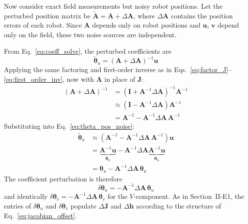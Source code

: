 \documentclass[lettersize,journal]{IEEEtran}
\begin{document}
Now consider exact field measurements but noisy robot positions. Let the perturbed position matrix be $\tilde{\mathbf{A}} = \mathbf{A} + \Delta\mathbf{A}$, where $\Delta\mathbf{A}$ contains the position errors of each robot. Since $\mathbf{A}$ depends only on robot positions and $\mathbf{u}$, $\mathbf{v}$ depend only on the field, these two noise sources are independent.

From Eq.~\eqref{eq:coeff_solve}, the perturbed coefficients are
\begin{equation}
    \tilde{\boldsymbol{\theta}}_u = (\mathbf{A} + \Delta\mathbf{A})^{-1}\mathbf{u}
    \label{eq:theta_pos_noise}
\end{equation}
Applying the same factoring and first-order inverse as in Eqs.~\eqref{eq:factor_J}--\eqref{eq:first_order_inv}, now with $\mathbf{A}$ in place of $\mathbf{J}$:
\begin{align}
    (\mathbf{A} + \Delta\mathbf{A})^{-1} &= \left(\mathbf{I} + \mathbf{A}^{-1}\Delta\mathbf{A}\right)^{-1}\mathbf{A}^{-1} \nonumber \\
    &\approx \left(\mathbf{I} - \mathbf{A}^{-1}\Delta\mathbf{A}\right)\mathbf{A}^{-1} \nonumber \\
    &= \mathbf{A}^{-1} - \mathbf{A}^{-1}\Delta\mathbf{A}\,\mathbf{A}^{-1}
    \label{eq:A_first_order_inv}
\end{align}
Substituting into Eq.~\eqref{eq:theta_pos_noise}:
\begin{align}
    \tilde{\boldsymbol{\theta}}_u &\approx \left(\mathbf{A}^{-1} - \mathbf{A}^{-1}\Delta\mathbf{A}\,\mathbf{A}^{-1}\right)\mathbf{u} \nonumber \\
    &= \underbrace{\mathbf{A}^{-1}\mathbf{u}}_{\boldsymbol{\theta}_u} - \mathbf{A}^{-1}\Delta\mathbf{A}\underbrace{\mathbf{A}^{-1}\mathbf{u}}_{\boldsymbol{\theta}_u} \nonumber \\
    &= \boldsymbol{\theta}_u - \mathbf{A}^{-1}\Delta\mathbf{A}\,\boldsymbol{\theta}_u
    \label{eq:theta_u_pos_perturbed}
\end{align}
The coefficient perturbation is therefore
\begin{equation}
    \delta\boldsymbol{\theta}_u = -\mathbf{A}^{-1}\Delta\mathbf{A}\,\boldsymbol{\theta}_u
    \label{eq:delta_theta_u_pos}
\end{equation}
and identically $\delta\boldsymbol{\theta}_v = -\mathbf{A}^{-1}\Delta\mathbf{A}\,\boldsymbol{\theta}_v$ for the $V$-component. As in Section~II-E1, the entries of $\delta\boldsymbol{\theta}_u$ and $\delta\boldsymbol{\theta}_v$ populate $\Delta\mathbf{J}$ and $\Delta\mathbf{h}$ according to the structure of Eq.~\eqref{eq:jacobian_offset}.
\end{document}

